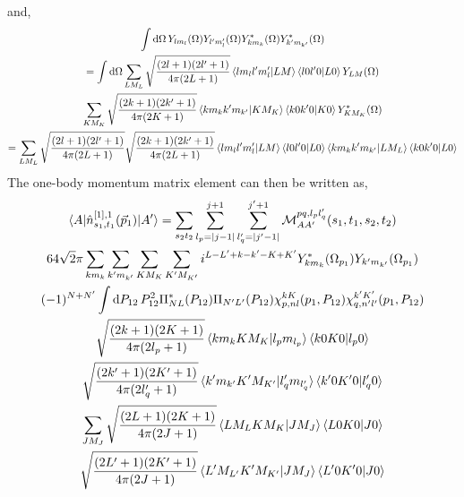 \documentclass[10pt]{article}
\begin{document}
and,
\begin{multline*}
	\int \text{d} \Omega \, Y_{ l m_l }(\Omega) Y_{ l' m_l'}(\Omega) Y_{ k 
m_k}^{*}(\Omega) Y_{ k' m_{k'}}^{*}(\Omega) \\
	= \int \text{d} \Omega \sum_{LM_L} \sqrt{ \frac{(2l+1)(2l'+1)}{4 \pi 
(2L+1)}} \braket{ l m_l l' m_l' | L M} \braket{ l 0 l' 0 | L 0 } Y_{L 
M}(\Omega) \\
	 \sum_{K M_K} \sqrt{ \frac{(2k+1)(2k'+1)}{4 \pi (2K+1)}} \braket{ k m_k 
k' m_{k'} | K M_K} \braket{ k 0 k' 0 | K 0 } Y_{K M_K}^{*}(\Omega) \\
	 = \sum_{LM_L} \sqrt{ \frac{(2l+1)(2l'+1)}{4 \pi (2L+1)}} \sqrt{ 
\frac{(2k+1)(2k'+1)}{4 \pi (2L+1)}} \braket{ l m_l l' m_l' | L M} \braket{ l 0 
l' 0 | L 0 } \braket{ k m_k k' m_{k'} | L M_L} \braket{ k 0 k' 0 | L 0 } 
\end{multline*}
The one-body momentum matrix element can then be written as,
\begin{multline*}
\braket{ A | \hat{n}_{s_1,t_1}^{[1],1}(\vec{p}_1) | A'} = \sum_{s_2 t_2}  
\sum_{l_p = |j-1|}^{j+1} \sum_{l_q' = |j' - 1|}^{j'+1} \mathcal{M}_{AA'}^{p 
q,l_p l_q'}(s_1,t_1,s_2,t_2) \\
 64 \sqrt{2} \pi \sum_{k m_k} \sum_{k' m_{k'}} \sum_{K M_K} \sum_{K' M_{K'}} 
i^{L-L'+k-k'-K+K'} Y_{k m_k}^{*}(\Omega_{p_1}) Y_{k' m_{k'}}(\Omega_{p_1}) \\
(-1)^{N+N'} \int \text{d} P_{12} \, P_{12}^{2} \Pi_{N L}^{*}(P_{12}) \Pi_{N' 
L'}(P_{12}) \chi_{p,nl}^{kK}(p_1,P_{12}) 
\chi_{q,n'l'}^{k'K'}(p_1,P_{12}) \\
    \sqrt{ \frac{(2 k + 1)(2 K+1)}{4 \pi (2 l_p +1 )}} \braket{ k m_k K M_K | 
l_p m_{l_p}} \braket{ k 0 K 0 | l_p 0} \\
    \sqrt{ \frac{(2 k' + 1)(2 K'+1)}{4 \pi (2 l_q' +1 )}} \braket{ k' m_{k'} K' 
M_{K'} | l_q' m_{l_q'}} \braket{ k' 0 K' 0 | l_q' 0} \\
    \sum_{J M_J} \sqrt{ \frac{ (2L+1)(2K+1)}{ 4 \pi (2 J+1)} } \braket{ L M_L K 
M_K | J M_J} \braket{ L 0 K 0 | J 0 } \\ \sqrt{ \frac{ (2L'+1)(2K'+1)}{ 4 \pi 
(2 J+1)} } \braket{L' M_{L'} K' M_{K'} | J M_J } \braket{ L' 0 K' 0 | J 0 } \\ 
\end{multline*}
\end{document}

